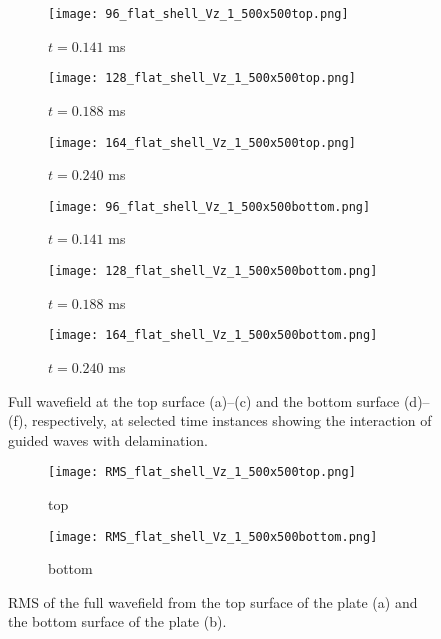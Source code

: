 \begin{figure} [h!]
	\centering
	\begin{subfigure}[b]{0.32\textwidth}
		\centering
		\texttt{[image: 96\_flat\_shell\_Vz\_1\_500x500top.png]}
		\caption{\(t=0.141\) ms}
		\label{fig:frame96top}
	\end{subfigure}
	\hfill
	\begin{subfigure}[b]{0.32\textwidth}
		\centering
		\texttt{[image: 128\_flat\_shell\_Vz\_1\_500x500top.png]}
		\caption{\(t=0.188\) ms}
		\label{fig:frame128top}
	\end{subfigure}
	\hfill
	\begin{subfigure}[b]{0.32\textwidth}
		\centering
		\texttt{[image: 164\_flat\_shell\_Vz\_1\_500x500top.png]}
		\caption{\(t=0.240\) ms}
		\label{fig:frame164top}
	\end{subfigure}	
	\hfill
	\begin{subfigure}[b]{0.32\textwidth}
		\centering
		\texttt{[image: 96\_flat\_shell\_Vz\_1\_500x500bottom.png]}
		\caption{\(t=0.141\) ms}
		\label{fig:frame96bottom}
	\end{subfigure}
	\hfill
	\begin{subfigure}[b]{0.32\textwidth}
		\centering
		\texttt{[image: 128\_flat\_shell\_Vz\_1\_500x500bottom.png]}
		\caption{\(t=0.188\) ms}
		\label{fig:frame128bottom}
	\end{subfigure}
	\hfill
	\begin{subfigure}[b]{0.32\textwidth}
		\centering
		\texttt{[image: 164\_flat\_shell\_Vz\_1\_500x500bottom.png]}
		\caption{\(t=0.240\) ms}
		\label{fig:frame164bottom}
	\end{subfigure}

	\caption{Full wavefield at the top surface (a)--(c) and the bottom surface (d)--(f), respectively, at selected time instances showing the interaction of guided waves with delamination.}
	\label{fig:wavefield}
\end{figure} 

\begin{figure} [h!]
	\centering
	\begin{subfigure}[b]{0.47\textwidth}
		\centering
		\texttt{[image: RMS\_flat\_shell\_Vz\_1\_500x500top.png]}
		\caption{top}
		\label{fig:rmstop}
	\end{subfigure}
	\hfill
	\begin{subfigure}[b]{0.47\textwidth}
		\centering
		\texttt{[image: RMS\_flat\_shell\_Vz\_1\_500x500bottom.png]}
		\caption{bottom}
		\label{fig:rmsbottom}
	\end{subfigure}
	\caption{RMS of the full wavefield from the top surface of the plate (a) and the bottom surface of the plate (b).}
\label{fig:rms}
\end{figure} 